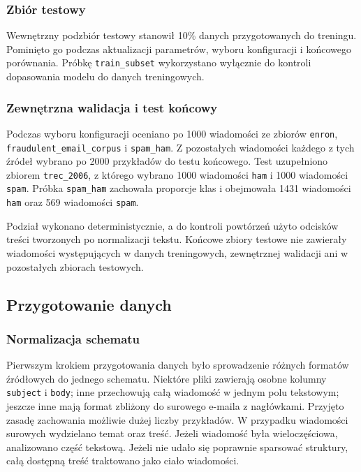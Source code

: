 \subsubsection{Zbiór testowy}

Wewnętrzny podzbiór testowy stanowił 10\% danych przygotowanych do treningu.
Pominięto go podczas aktualizacji parametrów, wyboru konfiguracji i końcowego
porównania. Próbkę \texttt{train\_subset} wykorzystano wyłącznie do kontroli
dopasowania modelu do danych treningowych.

\subsubsection{Zewnętrzna walidacja i test końcowy}

Podczas wyboru konfiguracji oceniano po 1000 wiadomości ze zbiorów
\texttt{enron}, \texttt{fraudulent\_\allowbreak email\_\allowbreak corpus} i
\texttt{spam\_ham}.
Z pozostałych wiadomości każdego z tych źródeł wybrano po 2000 przykładów do
testu końcowego. Test uzupełniono zbiorem \texttt{trec\_2006}, z
którego wybrano 1000 wiadomości \texttt{ham} i 1000 wiadomości \texttt{spam}.
Próbka \texttt{spam\_ham} zachowała proporcje klas i obejmowała 1431
wiadomości \texttt{ham} oraz 569 wiadomości \texttt{spam}.

Podział wykonano deterministycznie, a do kontroli powtórzeń użyto
odcisków treści tworzonych po normalizacji tekstu. Końcowe zbiory testowe nie
zawierały wiadomości występujących w danych treningowych, zewnętrznej
walidacji ani w pozostałych zbiorach testowych.

\subsection{Przygotowanie danych}

\subsubsection{Normalizacja schematu}

Pierwszym krokiem przygotowania danych było sprowadzenie różnych formatów
źródłowych do jednego schematu. Niektóre pliki zawierają osobne kolumny
\texttt{subject} i \texttt{body}; inne przechowują całą wiadomość w jednym polu
tekstowym; jeszcze inne mają format zbliżony do surowego e-maila z nagłówkami.
Przyjęto zasadę zachowania możliwie dużej liczby przykładów. W przypadku
wiadomości surowych wydzielano temat oraz treść. Jeżeli wiadomość była
wieloczęściowa, analizowano część tekstową. Jeżeli nie udało się poprawnie
sparsować struktury, całą dostępną treść traktowano jako ciało wiadomości.

